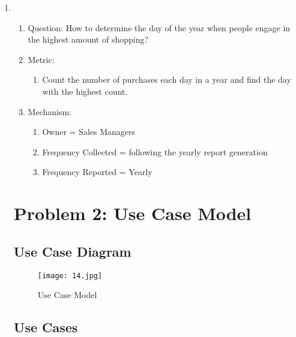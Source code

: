 \documentclass[12pt,letterpaper]{report}
\begin{document}
\begin{enumerate}
\item
    \begin{enumerate}
    \item Question: How to determine the day of the year when people engage in the highest amount of shopping?
    \item Metric: 
        \begin{enumerate}
            \item  Count the number of purchases each day in a year and find the day with the highest count.
        \end{enumerate}
    \item Mechanism:
	\begin{enumerate}
    \item Owner = Sales Managers
    \item Frequency Collected = following the yearly report generation
    \item Frequency Reported = Yearly
    \end{enumerate}
\end{enumerate}

\chapter{Problem 2: Use Case Model}
\section{Use Case Diagram}

\begin{figure}[h]
    \begin{center}
    \texttt{[image: 14.jpg]}
    \end{center}
       \caption{Use Case Model \label{Use Case Model}}
\end{figure}

\section{Use Cases}


\end{enumerate}
\end{document}
